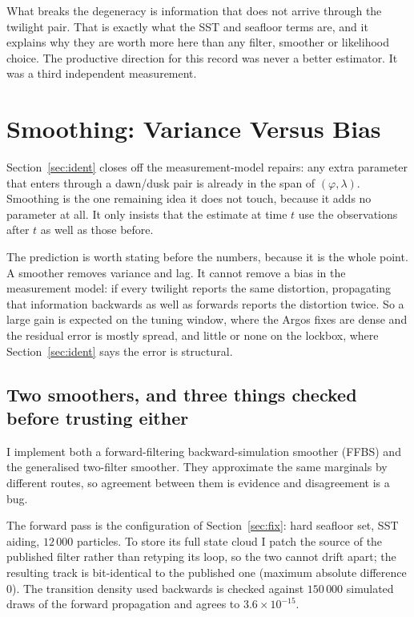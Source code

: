 \documentclass[conference]{IEEEtran}
\begin{document}
What breaks the degeneracy is information that does not arrive through the twilight
pair. That is exactly what the SST and seafloor terms are, and it explains why they
are worth more here than any filter, smoother or likelihood choice. The productive
direction for this record was never a better estimator. It was a third independent
measurement.

\section{Smoothing: Variance Versus Bias}
\label{sec:smooth}

Section~\ref{sec:ident} closes off the measurement-model repairs: any extra
parameter that enters through a dawn/dusk pair is already in the span of
$(\varphi,\lambda)$. Smoothing is the one remaining idea it does not touch,
because it adds no parameter at all. It only insists that the estimate at time
$t$ use the observations after $t$ as well as those before.

The prediction is worth stating before the numbers, because it is the whole
point. A smoother removes variance and lag. It cannot remove a bias in the
measurement model: if every twilight reports the same distortion, propagating
that information backwards as well as forwards reports the distortion twice. So
a large gain is expected on the tuning window, where the Argos fixes are dense
and the residual error is mostly spread, and little or none on the lockbox,
where Section~\ref{sec:ident} says the error is structural.

\subsection{Two smoothers, and three things checked before trusting either}

I implement both a forward-filtering backward-simulation smoother (FFBS) and the
generalised two-filter smoother. They approximate the same marginals by
different routes, so agreement between them is evidence and disagreement is a
bug.

The forward pass is the configuration of Section~\ref{sec:fix}: hard seafloor
set, SST aiding, $12\,000$ particles. To store its full state cloud I patch the
source of the published filter rather than retyping its loop, so the two cannot
drift apart; the resulting track is bit-identical to the published one (maximum
absolute difference $0$). The transition density used backwards is checked
against $150\,000$ simulated draws of the forward propagation and agrees to
$3.6\times10^{-15}$.
\end{document}

